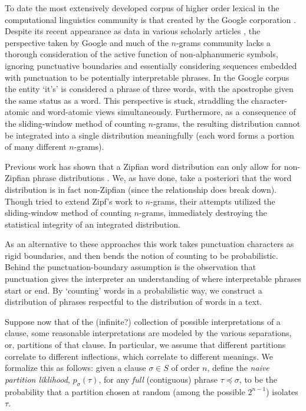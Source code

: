 To date the most extensively developed corpus of higher order lexical
in the computational linguistics community is that created by the
Google corporation \cite{Google01}. Despite its recent appearance as
data in various scholarly articles\cite{Garcia01,Piantadosi01} , the
perspective taken by Google and much of the $n$-grams community lacks
a thorough consideration of the active function of non-alphanumeric
symbols, ignoring punctuative boundaries and essentially considering
sequences embedded with punctuation to be potentially interpretable
phrases. In the Google corpus the entity `it's' is considered a phrase
of three words, with the apostrophe given the same status as a
word. This perspective is stuck, straddling the character-atomic and
word-atomic views simultaneously. Furthermore, as a consequence of the
sliding-window method of counting $n$-grams, the resulting
distribution cannot be integrated into a single distribution
meaningfully (each word forms a portion of many different $n$-grams).

Previous work has shown that a Zipfian word distribution can only
allow for non-Zipfian phrase distributions \cite{Egghe01}.
We, as
\cite{Ha01} have done, take a posteriori that the word distribution is
in fact non-Zipfian (since the relationship does break down).
Though
\cite{Ha01} tried to extend Zipf's work to $n$-grams, their attempts
utilized the sliding-window method of counting $n$-grams, immediately
destroying the statistical integrity of an integrated distribution.

As an alternative to these approaches this work takes punctuation
characters as rigid boundaries, and then bends the notion of counting
to be probabilistic.
Behind the punctuation-boundary assumption is the
observation that punctuation gives the interpreter an understanding of
where interpretable phrases start or end.
By `counting' words in a
probabilistic way, we construct a distribution of phrases respectful
to the distribution of words in a text.


Suppose now that of the (infinite?) collection of possible
interpretations of a clause, some reasonable interpretations are
modeled by the various separations, or, partitions of that clause.  In
particular, we assume that different partitions correlate to different
inflections, which correlate to different meanings.  We formalize this
as follows: given a clause $\sigma\in S$ of order $n$, define the
\emph{naive partition liklihood}, $p_\sigma(\tau)$, for any
\emph{full} (contiguous) phrase $\tau\preceq\sigma$, to be the
probability that a partition chosen at random (among the possible
$2^{n-1}$) isolates $\tau$.

